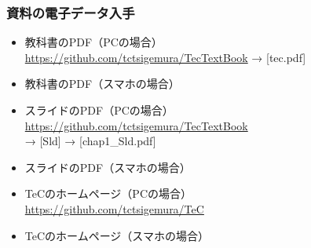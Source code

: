 \documentclass{beamer}                 %
\begin{document}
\begin{frame}
  \frametitle{資料の電子データ入手}
  \begin{itemize}
  \item 教科書のPDF（PCの場合） \\
    \url{https://github.com/tctsigemura/TecTextBook} → [tec.pdf]
  \item 教科書のPDF（スマホの場合）
  \item スライドのPDF（PCの場合） \\
    \url{https://github.com/tctsigemura/TecTextBook} \\
    → [Sld] → [chap1\_Sld.pdf] \\
  \item スライドのPDF（スマホの場合）
  \item TeCのホームページ（PCの場合） \\
    \url{https://github.com/tctsigemura/TeC}
  \item TeCのホームページ（スマホの場合）
  \end{itemize}
  \vfill
\end{frame}
\end{document}
